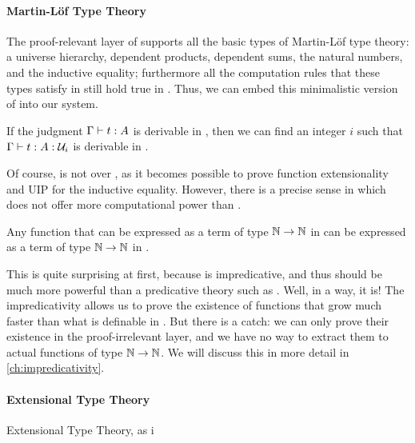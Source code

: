 \paragraph*{Martin-Löf Type Theory}
% 
The proof-relevant layer of \SetoidCC supports all the basic types of Martin-Löf 
type theory: a universe hierarchy, dependent products, dependent sums, the natural 
numbers, and the inductive equality; furthermore all the computation rules that 
these types satisfy in \MLTT still hold true in \SetoidCC.
% 
Thus, we can embed this minimalistic version of \MLTT into our system.

\begin{theorem}[Embedding]
	If the judgment \( \Gamma \vdash t : A \) is derivable in \MLTT, then
	we can find an integer \( i \) such that \( \Gamma \vdash t : A : \mathcal{U}_i \)
	is derivable in \SetoidCC. 
\end{theorem} 

Of course, \SetoidCC is not 
 over \MLTT, as it becomes 
possible to prove function extensionality and UIP for the inductive equality.
% 
However, there is a precise sense in which \SetoidCC does not offer more
computational power than \MLTT. 

\begin{theorem}
	Any function that can be expressed as a term of type \( \mathbb{N} \to \mathbb{N} \)
	in \SetoidCC can be expressed as a term of type \( \mathbb{N} \to \mathbb{N} \) in
	\MLTT.
\end{theorem}

This is quite surprising at first, because \SetoidCC is impredicative, and thus
should be much more powerful than a predicative theory such as \MLTT. 
% 
Well, in a way, it is! The impredicativity allows us to prove the existence
of functions that grow much faster than what is definable in \MLTT. But there is
a catch: we can only prove their existence in the proof-irrelevant layer, and
we have no way to extract them to actual functions of type \( \mathbb{N} \to \mathbb{N} \).
We will discuss this in more detail in \cref{ch:impredicativity}.

\paragraph*{Extensional Type Theory}
% 
Extensional Type Theory, as i

